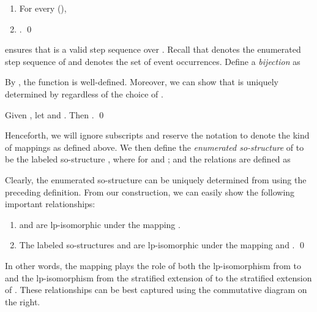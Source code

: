 \documentclass{llncs}
\begin{document}
\begin{proposition}  
\begin{enumerate}
\item For every  (), 
\item . \qed
\end{enumerate}
\label{prop:validss}
\end{proposition}


  ensures that   is a valid step sequence over . Recall that  denotes the enumerated step sequence of  and  denotes the set of event occurrences. Define a  \emph{bijection}  as\\
\mbox{\hspace{2.7cm}}\smallskip

By , the function  is well-defined.  Moreover, we can show that  is uniquely determined by  regardless of the choice of .

\begin{proposition} Given , let  and . Then . \qed
\label{prop:uniquexi}
\end{proposition}



Henceforth, we will ignore subscripts and reserve  the notation   to denote the kind of mappings as defined above. We then define the \emph{enumerated so-structure} of  to be the labeled so-structure , where  for  and ;  and the relations  are defined as\\
\mbox{\hspace{1.6cm}}

Clearly, the  enumerated so-structure  can be uniquely determined from  using the preceding definition.  From our construction, we can easily show the following important relationships:

\begin{proposition} 
\begin{enumerate}
\item  and  are  lp-isomorphic under the mapping . 
\item The labeled so-structures   and  are lp-isomorphic under the mapping  and . \qed 
\end{enumerate} 
\label{prop:isoExt}
\end{proposition}
\begin{minipage}{7.2cm}
\hspace{0.5cm}In other words, the mapping  plays 
the role of both the lp-isomorphism from  to  and the lp-isomorphism from the stratified extension  of  to the stratified extension  of . These relationships can be best captured using the commutative diagram on the right.\smallskip
\end{minipage}
\begin{minipage}{4.5cm}\centering\small\vspace{-3mm}

 \end{minipage}
\end{document}

